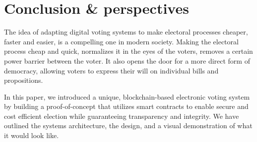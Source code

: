 \chapter{Conclusion \& perspectives}

The idea of adapting digital voting systems to make electoral processes cheaper, faster and easier, is a compelling
one in modern society. Making the electoral process cheap
and quick, normalizes it in the eyes of the voters, removes a
certain power barrier between the voter. It also opens the door for a more direct form of democracy, allowing voters to express their will on individual bills and propositions.

In this paper, we introduced a unique, blockchain-based electronic voting system by building a proof-of-concept that utilizes smart contracts to enable secure and cost efficient election while guaranteeing transparency and integrity. We have outlined the systems architecture, the design, and a visual demonstration of what it would look like. %

